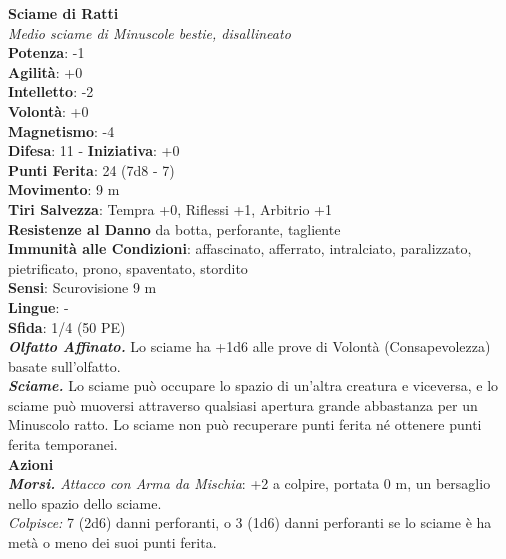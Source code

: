 \begin{multicols}{2}
\medskip\textbf{Sciame di Ratti}\\
\emph{Medio sciame di Minuscole bestie, disallineato}\\
\textbf{Potenza}: -1\\
\textbf{Agilità}: +0\\
\textbf{Intelletto}: -2\\
\textbf{Volontà}: +0\\
\textbf{Magnetismo}: -4\\
\textbf{Difesa}: 11 - \textbf{Iniziativa}: +0\\
\textbf{Punti Ferita}: 24 (7d8 - 7)\\
\textbf{Movimento}: 9 m\\
\textbf{Tiri Salvezza}: Tempra +0, Riflessi +1, Arbitrio +1\\
\textbf{Resistenze al Danno} da botta, perforante, tagliente\\
\textbf{Immunità alle Condizioni}: affascinato, afferrato, intralciato, paralizzato, pietrificato, prono, spaventato, stordito\\
\textbf{Sensi}: Scurovisione 9 m\\
\textbf{Lingue}: -\\
\textbf{Sfida}: 1/4 (50 PE)\smallskip\\
\emph{\textbf{Olfatto Affinato.}} Lo sciame ha +1d6 alle prove di Volontà (Consapevolezza) basate sull'olfatto.\\
\emph{\textbf{Sciame.}} Lo sciame può occupare lo spazio di un'altra creatura e viceversa, e lo sciame può muoversi attraverso qualsiasi apertura grande abbastanza per un Minuscolo ratto. Lo sciame non può recuperare punti ferita né ottenere punti ferita temporanei.\\
\smallskip\textbf{Azioni}\\
\emph{\textbf{Morsi.} Attacco con Arma da Mischia}: +2 a colpire, portata 0 m, un bersaglio nello spazio dello sciame.\\
\emph{Colpisce:} 7 (2d6) danni perforanti, o 3 (1d6) danni perforanti se lo sciame è ha metà o meno dei suoi punti ferita.\\


\end{multicols}
